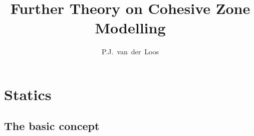 \documentclass[times,namecite]{goose-article}
\title{%
  Further Theory on Cohesive Zone Modelling
}
\author{P.J.~van~der~Loos}
\begin{document}
\maketitle

\setcounter{tocdepth}{2}
\tableofcontents

\section{Statics}

\subsection{The basic concept}
% 
\end{document}
